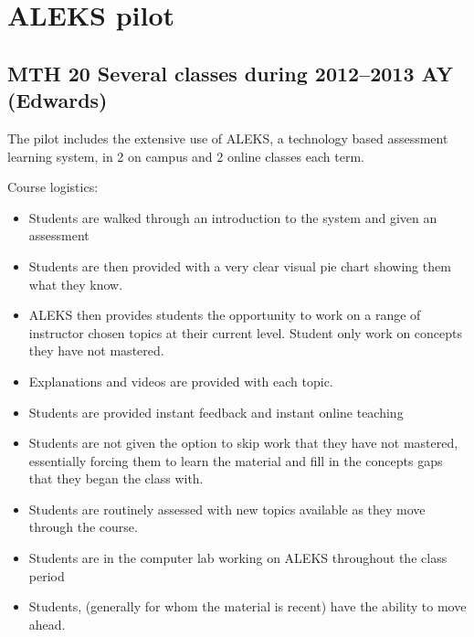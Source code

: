 \chapter{ALEKS pilot}\label{app:sec:aleks}
\section{MTH 20 Several classes during 2012--2013 AY (Edwards)}

The pilot includes the extensive use of ALEKS, a technology based assessment learning system,  in 2 on campus and 2 online classes each term.  

Course logistics: 
\begin{itemize}
	\item Students are walked through an introduction to the system and given an assessment
	\item Students are then provided with a very clear visual pie chart showing them what they know.
	\item ALEKS then provides students the opportunity to work on a range of instructor chosen topics at their current level.  
	Student only work on concepts they have not mastered.
	\item Explanations and videos are provided with each topic.
	\item Students are provided instant feedback and instant online teaching
	\item Students are not given the option to skip work that they have not mastered, essentially forcing them to learn the material and 
	fill in the concepts gaps that they began the class with.
	\item Students are routinely assessed with new topics available as they move through the course.
	\item Students are in the computer lab working on ALEKS throughout the class period
	\item Students, (generally for whom the material is recent) have the ability to move ahead.  
\end{itemize}

